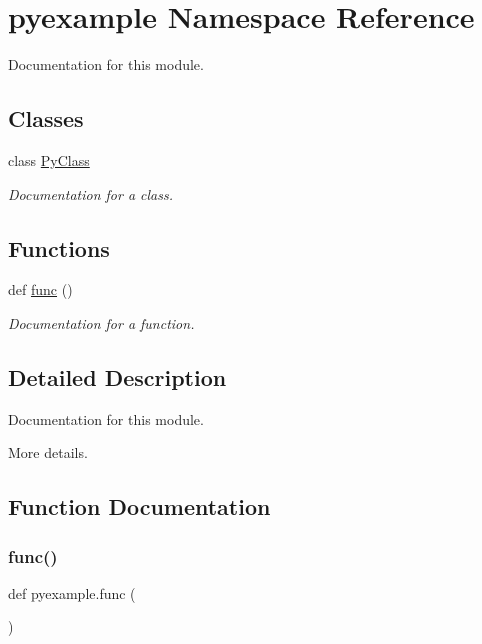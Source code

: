 \hypertarget{namespacepyexample}{}\section{pyexample Namespace Reference}
\label{namespacepyexample}


Documentation for this module.  


\subsection*{Classes}
\begin{DoxyCompactItemize}
\item 
class \mbox{\hyperlink{classpyexample_1_1_py_class}{Py\+Class}}
\begin{DoxyCompactList}\small\item\em Documentation for a class. \end{DoxyCompactList}\end{DoxyCompactItemize}
\subsection*{Functions}
\begin{DoxyCompactItemize}
\item 
def \mbox{\hyperlink{namespacepyexample_a2daf35288bc9d0a1d4233ab18b553451}{func}} ()
\begin{DoxyCompactList}\small\item\em Documentation for a function. \end{DoxyCompactList}\end{DoxyCompactItemize}


\subsection{Detailed Description}
Documentation for this module. 

More details. 

\subsection{Function Documentation}
\mbox{\label{namespacepyexample_a2daf35288bc9d0a1d4233ab18b553451}} 
\subsubsection{\texorpdfstring{func()}{func()}}
{\footnotesize\ttfamily def pyexample.\+func (\begin{DoxyParamCaption}{ }\end{DoxyParamCaption})}



